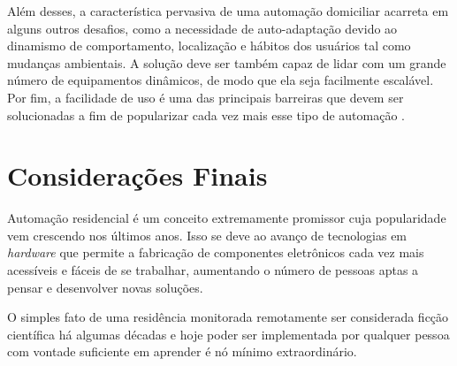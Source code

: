 Além desses, a característica pervasiva de uma automação domiciliar acarreta em alguns outros desafios, como
a necessidade de auto-adaptação devido ao dinamismo de comportamento, localização e hábitos dos usuários tal
como mudanças ambientais. A solução deve ser também capaz de lidar com um grande número de equipamentos
dinâmicos, de modo que ela seja facilmente escalável. Por fim, a facilidade de uso é uma das principais
barreiras que devem ser solucionadas a fim de popularizar cada vez mais esse tipo de automação
\cite{lalanda2010}.

\section{Considerações Finais}
Automação residencial é um conceito extremamente promissor cuja popularidade vem crescendo nos últimos anos.
Isso se deve ao avanço de tecnologias em  \textit{hardware} que permite a fabricação de componentes eletrônicos cada vez mais
acessíveis e fáceis de se trabalhar, aumentando o número de pessoas aptas a pensar e desenvolver novas
soluções.

O simples fato de uma residência monitorada remotamente ser considerada ficção científica há algumas décadas e
hoje poder ser implementada por qualquer pessoa com vontade suficiente em aprender é nó mínimo
extraordinário.
